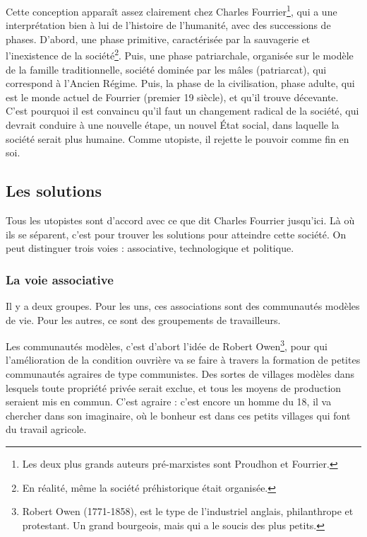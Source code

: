 \documentclass[12pt]{report}
\begin{document}
Cette conception apparaît assez clairement chez Charles Fourrier\footnote{Les deux plus grands auteurs pré-marxistes sont Proudhon et Fourrier.}, qui a une interprétation bien à lui de l'histoire de l'humanité, avec des successions de phases. D'abord, une phase primitive, caractérisée par la sauvagerie et l'inexistence de la société\footnote{En réalité, même la société préhistorique était organisée.}. Puis, une phase patriarchale, organisée sur le modèle de la famille traditionnelle, société dominée par les mâles (patriarcat), qui correspond à l'Ancien Régime. Puis, la phase de la civilisation, phase adulte, qui est le monde actuel de Fourrier (premier 19 siècle), et qu'il trouve décevante. C'est pourquoi il est convaincu qu'il faut un changement radical de la société, qui devrait conduire à une nouvelle étape, un nouvel État social, dans laquelle la société serait plus humaine.
Comme utopiste, il rejette le pouvoir comme fin en soi.

\subsection{Les solutions}

Tous les utopistes sont d'accord avec ce que dit Charles Fourrier jusqu'ici. Là où ils se séparent, c'est pour trouver les solutions pour atteindre cette société. On peut distinguer trois voies : associative, technologique et politique.

\subsubsection{La voie associative}

Il y a deux groupes.
Pour les uns, ces associations sont des communautés modèles de vie. Pour les autres, ce sont des groupements de travailleurs.

Les communautés modèles, c'est d'abort l'idée de Robert Owen\footnote{Robert Owen (1771-1858), est le type de l'industriel anglais, philanthrope et protestant. Un grand bourgeois, mais qui a le soucis des plus petits.}, pour qui l'amélioration de la condition ouvrière va se faire à travers la formation de petites communautés agraires de type communistes. Des sortes de villages modèles dans lesquels toute propriété privée serait exclue, et tous les moyens de production seraient mis en commun.
C'est agraire : c'est encore un homme du 18, il va chercher dans son imaginaire, où le bonheur est dans ces petits villages qui font du travail agricole.
\end{document}
